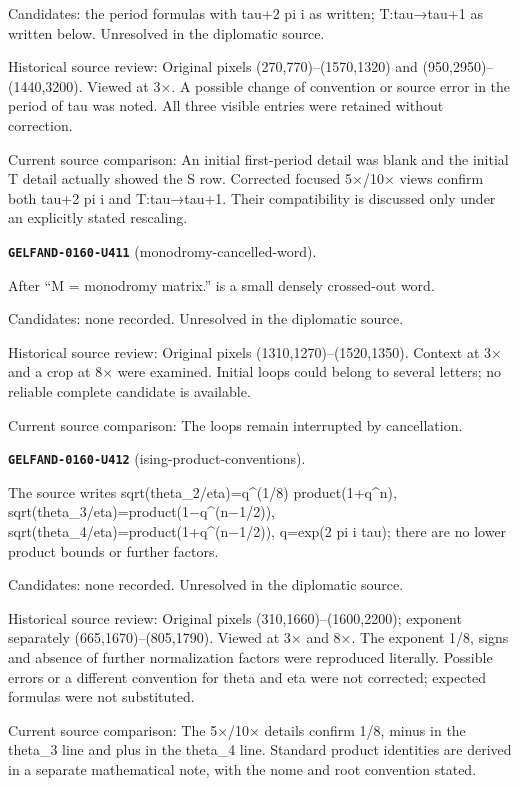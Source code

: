 Candidates: the period formulas with tau+2 pi i as written; T:tau→tau+1 as written below. Unresolved in the diplomatic source.\par
Historical source review: Original pixels (270,770)–(1570,1320) and (950,2950)–(1440,3200). Viewed at 3×. A possible change of convention or source error in the period of tau was noted. All three visible entries were retained without correction.\par
Current source comparison: An initial first-period detail was blank and the initial T detail actually showed the S row. Corrected focused 5×/10× views confirm both tau+2 pi i and T:tau→tau+1. Their compatibility is discussed only under an explicitly stated rescaling.\par\medskip
\par\noindent\leavevmode{}\label{GELFAND-0160-U411}\label{GELFAND-P001481:monodromy-cancelled-word}\textbf{\texttt{GELFAND-0160-U411}} (monodromy-cancelled-word).\nopagebreak[4]\par
After “M = monodromy matrix.” is a small densely crossed-out word.\par
Candidates: none recorded. Unresolved in the diplomatic source.\par
Historical source review: Original pixels (1310,1270)–(1520,1350). Context at 3× and a crop at 8× were examined. Initial loops could belong to several letters; no reliable complete candidate is available.\par
Current source comparison: The loops remain interrupted by cancellation.\par\medskip
\par\noindent\leavevmode{}\label{GELFAND-0160-U412}\label{GELFAND-P001481:ising-product-conventions}\textbf{\texttt{GELFAND-0160-U412}} (ising-product-conventions).\nopagebreak[4]\par
The source writes sqrt(theta\_2/eta)=q\textasciicircum{}(1/8) product(1+q\textasciicircum{}n), sqrt(theta\_3/eta)=product(1−q\textasciicircum{}(n−1/2)), sqrt(theta\_4/eta)=product(1+q\textasciicircum{}(n−1/2)), q=exp(2 pi i tau); there are no lower product bounds or further factors.\par
Candidates: none recorded. Unresolved in the diplomatic source.\par
Historical source review: Original pixels (310,1660)–(1600,2200); exponent separately (665,1670)–(805,1790). Viewed at 3× and 8×. The exponent 1/8, signs and absence of further normalization factors were reproduced literally. Possible errors or a different convention for theta and eta were not corrected; expected formulas were not substituted.\par
Current source comparison: The 5×/10× details confirm 1/8, minus in the theta\_3 line and plus in the theta\_4 line. Standard product identities are derived in a separate mathematical note, with the nome and root convention stated.\par\medskip
